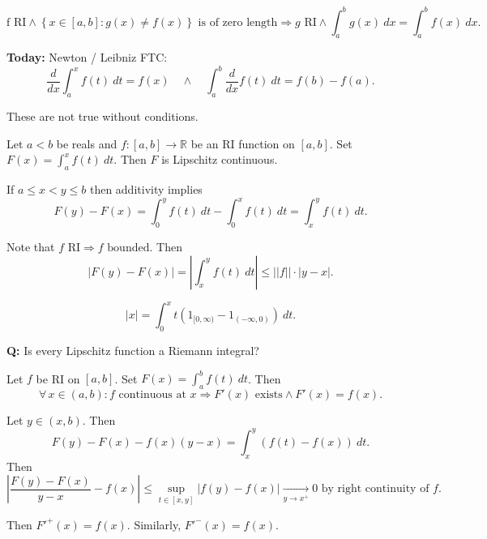 \documentclass{notes}
\begin{document}
  \begin{cor}
    \[
      \text{f RI} \land \left \{ x \in [a, b] : g(x) \neq f(x) \right \} \text{ is of zero length} \Rightarrow \text{$g$ RI} \land \int_a^b g(x)\ dx = \int_a^b f(x)\ dx.
    \]
  \end{cor}
  
  {\boldmath \bfseries Today:} Newton / Leibniz FTC: 
  \[
    \frac{d}{dx} \int_a^x f(t)\ dt = f(x) \quad \land \quad \int_a^b \frac{d}{dx} f(t)\ dt = f(b) - f(a).
  \]
  
  \begin{note}
    These are not true without conditions.
  \end{note}
  
  \begin{lem}
    Let $a < b$ be reals and $f \colon [a, b] \to \mathbb R$ be an RI function on $[a, b]$.
    Set $F(x) = \int_a^x f(t)\ dt$.
    Then $F$ is Lipschitz continuous.
  \end{lem}
  
  \begin{prf}
    If $a \leq x < y \leq b$ then additivity implies 
    \[
      F(y) - F(x) = \int_0^y f(t)\ dt - \int_0^x f(t)\ dt = \int_x^y f(t)\ dt.
    \]
    
    Note that $\text{$f$ RI} \Rightarrow \text{$f$ bounded}$.
    Then 
    \[
      \left | F(y) - F(x) \right | = \left | \int_x^y f(t)\ dt \right | \leq ||f|| \cdot \left | y - x \right |.
    \]
  \end{prf}
  
  \begin{eg}
    \[
      \left | x \right | = \int_0^x t (1_{[0, \infty)} - 1_{(-\infty, 0)})\ dt.
    \]
  \end{eg}
  
  {\boldmath \bfseries Q:} Is every Lipschitz function a Riemann integral?
  
  \begin{lem}
    Let $f$ be RI on $[a, b]$.
    Set $F(x) = \int_a^b f(t)\ dt$.
    Then 
    \[
      \forall \, x \in (a, b): \text{$f$ continuous at $x$} \Rightarrow \text{$F'(x)$ exists} \land F'(x) = f(x).
    \]
  \end{lem}
  
  \begin{prf}
    Let $y \in (x, b)$.
    Then 
    \[
      F(y) - F(x) - f(x) (y - x) = \int_x^y (f(t) - f(x))\ dt.
    \]
    Then 
    \[
      \left | \frac{F(y) - F(x)}{y - x} - f(x) \right | \leq \sup_{t \in [x, y]} \left | f(y) - f(x) \right | \underset{y \to x^+}{\longrightarrow} 0 \text{ by right continuity of $f$}.
    \]
    
    Then $F'^+(x) = f(x)$.
    Similarly, $F'^-(x) = f(x)$.
  \end{prf}
  
\end{document}

